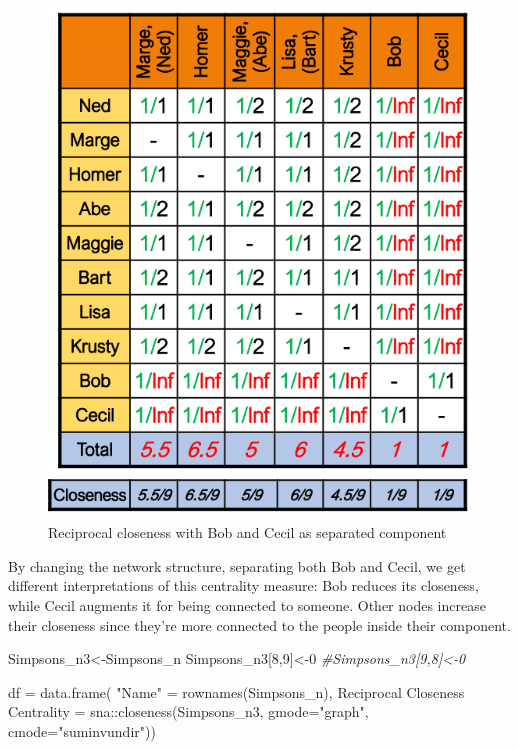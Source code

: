 \documentclass[
  notitlepage,
  onecolumn,
  openany]{book}
\newenvironment{Shaded}{\begin{snugshade}}{\end{snugshade}}
\newcommand{\AttributeTok}[1]{\textcolor[rgb]{0.77,0.63,0.00}{#1}}
\newcommand{\CommentTok}[1]{\textcolor[rgb]{0.56,0.35,0.01}{\textit{#1}}}
\newcommand{\DecValTok}[1]{\textcolor[rgb]{0.00,0.00,0.81}{#1}}
\newcommand{\FunctionTok}[1]{\textcolor[rgb]{0.00,0.00,0.00}{#1}}
\newcommand{\NormalTok}[1]{#1}
\newcommand{\OtherTok}[1]{\textcolor[rgb]{0.56,0.35,0.01}{#1}}
\newcommand{\SpecialCharTok}[1]{\textcolor[rgb]{0.00,0.00,0.00}{#1}}
\newcommand{\StringTok}[1]{\textcolor[rgb]{0.31,0.60,0.02}{#1}}
\begin{document}
\begin{figure}[h!]

{\centering \includegraphics[width=0.5\linewidth]{images/04-Centrality/Untitled 4} 

}

\caption{Reciprocal closeness with Bob and Cecil as separated component}\label{fig:unnamed-chunk-22}
\end{figure}

By changing the network structure, separating both Bob and Cecil, we get different interpretations of this centrality measure: Bob reduces its closeness, while Cecil augments it for being connected to someone. Other nodes increase their closeness since they're more connected to the people inside their component.

\begin{Shaded}
\begin{Highlighting}[]
\NormalTok{Simpsons\_n3}\OtherTok{\textless{}{-}}\NormalTok{Simpsons\_n}
\NormalTok{Simpsons\_n3[}\DecValTok{8}\NormalTok{,}\DecValTok{9}\NormalTok{]}\OtherTok{\textless{}{-}}\DecValTok{0}
\CommentTok{\#Simpsons\_n3[9,8]\textless{}{-}0}

\NormalTok{df }\OtherTok{=} \FunctionTok{data.frame}\NormalTok{(}
    \StringTok{"Name"} \OtherTok{=} \FunctionTok{rownames}\NormalTok{(Simpsons\_n),}
    \StringTok{\textasciigrave{}}\AttributeTok{Reciprocal Closeness Centrality}\StringTok{\textasciigrave{}} \OtherTok{=}\NormalTok{ sna}\SpecialCharTok{::}\FunctionTok{closeness}\NormalTok{(Simpsons\_n3, }
                                                       \AttributeTok{gmode=}\StringTok{"graph"}\NormalTok{,}
                                                       \AttributeTok{cmode=}\StringTok{"suminvundir"}\NormalTok{))}
\end{Highlighting}
\end{Shaded}
\end{document}
